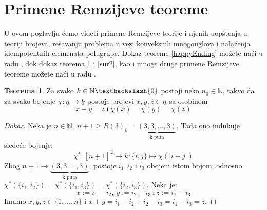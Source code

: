 \documentclass{article}
\theoremstyle{definition}
\newtheorem{teorema}{Teorema}[section]
\newcommand{\dokaz}[1]{\begin{proof}[Dokaz]#1\end{proof}}
\begin{document}
	\section{Primene Remzijeve teoreme} \label{primenePoglavlje}
	U ovom poglavlju ćemo videti primene Remzijeve teorije i njenih uopštenja u teoriji brojeva, rešavanju problema u vezi konveksnih mnogouglova i nalaženja idempotentnih elemenata polugrupe. Dokaz teoreme \ref{happyEnding} možete naći u radu \cite{happyEndingProof}, dok dokaz teorema \ref{sur} i \ref{sur2}, kao i mnoge druge primene Remzijeve teoreme možete naći u radu \cite{RamseyPrimene}.
	
	\begin{teorema}\label{sur}
		Za svako $k \in \mathbb{N}\textbackslash \{0\}$  postoji neko $n_{0} \in \mathbb{N}$, takvo da za svako bojenje $\chi:\underline{n} \rightarrow \underline{k}$ postoje brojevi $x, y, z \in \underline{n}$ sa osobinom 
		\[
		x + y = z \: \mathrm{i} \: \chi(x)= \chi(y)=\chi(z)
		\]
	\end{teorema}
	\dokaz{
		Neka je $n \in \mathbb{N},\: n+1 \geq R(3)_k=\underbrace{(3,3,\ldots,3)}_\text{k puta}$. Tada ono indukuje sledeće bojenje:
		\[
		\chi^*:[\underline{n+1}]^2\rightarrow \underline{k}:\{i,j\}\mapsto \chi(|i-j|)
		\]
		Zbog $n+1 \rightarrow \underbrace{(3,3,\ldots,3)}_\text{k puta}$, postoje $i_1, i_2$ i $i_3$ obojeni istom bojom, odnosno $\chi^*(\{i_1,i_2\})=\chi^*(\{i_1,i_3\})=\chi^*(\{i_2,i_3\})$. Neka je:
		\[
		x:=i_1-i_2,\:y:=i_2-i_3\:\mathrm{i}\:z:=i_1-i_3
		\]
		Imamo $x,y,z\in \{1,\ldots,n\}$ i $x+y=i_1-i_2+i_2-i_3=i_1-i_3=z$.
	}
	
\end{document}
